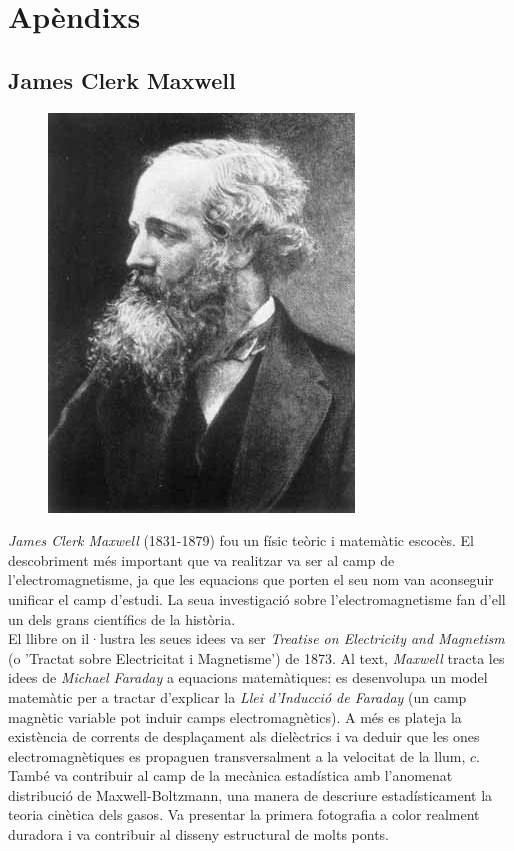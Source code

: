 \documentclass[11pt]{article}
\begin{document}
\clearpage
\section{Apèndixs}
    \subsection{James Clerk Maxwell}\label{appendix:maxwell}
        \vspace{0.2cm}
        \begin{figure}
            \vspace{-0.89cm}
            \begin{center}
                \includegraphics[width=.255\textwidth]{fotos/maxwell.jpeg}
            \end{center}
        \end{figure}
        \textit{James Clerk Maxwell} (1831-1879) fou un físic teòric i matemàtic escocès. El descobriment més important que va realitzar va ser al camp de l'electromagnetisme, ja que les equacions que porten el seu nom van aconseguir unificar el camp d'estudi. La seua investigació sobre l'electromagnetisme fan d'ell un dels grans científics de la història.\\
        
        El llibre on il·lustra les seues idees va ser \textit{Treatise on Electricity and Magnetism} (o 'Tractat sobre Electricitat i Magnetisme') de 1873. Al text, \textit{Maxwell} tracta les idees de \textit{Michael Faraday} a equacions matemàtiques: es desenvolupa un model matemàtic per a tractar d'explicar la \textit{Llei d'Inducció de Faraday} (un camp magnètic variable pot induir camps electromagnètics). A més es plateja la existència de corrents de desplaçament als dielèctrics i va deduir que les ones electromagnètiques es propaguen transversalment a la velocitat de la llum, $c$. \\

        També va contribuir al camp de la mecànica estadística amb l'anomenat distribució de Maxwell-Boltzmann, una manera de descriure estadísticament la teoria cinètica dels gasos. Va presentar la primera fotografia a color realment duradora i va contribuir al disseny estructural de molts ponts.\\ 
\end{document}
